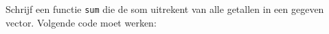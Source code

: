 \begin{question}
  Schrijf een functie {\tt sum} die de som uitrekent van alle getallen in een gegeven vector.
  Volgende code moet werken:
\begin{solutionblock}
\end{solutionblock}
\end{question}
